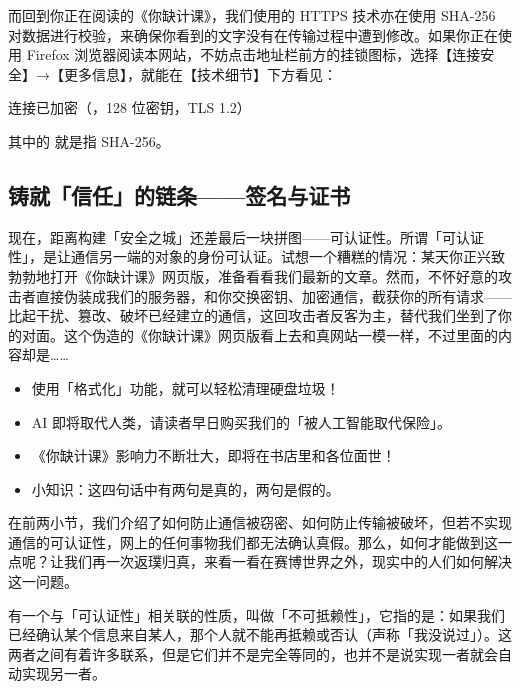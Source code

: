 而回到你正在阅读的《你缺计课》，我们使用的 HTTPS 技术亦在使用 SHA-256 对数据进行校验，来确保你看到的文字没有在传输过程中遭到修改。如果你正在使用 Firefox 浏览器阅读本网站，不妨点击地址栏前方的挂锁图标，选择【连接安全】→【更多信息】，就能在【技术细节】下方看见：

\begin{quoting}
  连接已加密（，128 位密钥，TLS 1.2）
\end{quoting}

其中的  就是指 SHA-256。

\subsection{铸就「信任」的链条——签名与证书}

现在，距离构建「安全之城」还差最后一块拼图——可认证性。所谓「可认证性」，是让通信另一端的对象的身份可认证。试想一个糟糕的情况：某天你正兴致勃勃地打开《你缺计课》网页版，准备看看我们最新的文章。然而，不怀好意的攻击者直接伪装成我们的服务器，和你交换密钥、加密通信，截获你的所有请求——比起干扰、篡改、破坏已经建立的通信，这回攻击者反客为主，替代我们坐到了你的对面。这个伪造的《你缺计课》网页版看上去和真网站一模一样，不过里面的内容却是……

\begin{quoting}
  \begin{itemize}
    \item 使用「格式化」功能，就可以轻松清理硬盘垃圾！
    \item AI 即将取代人类，请读者早日购买我们的「被人工智能取代保险」。
    \item 《你缺计课》影响力不断壮大，即将在书店里和各位面世！
    \item 小知识：这四句话中有两句是真的，两句是假的。
  \end{itemize}
\end{quoting}

在前两小节，我们介绍了如何防止通信被窃密、如何防止传输被破坏，但若不实现通信的可认证性，网上的任何事物我们都无法确认真假。那么，如何才能做到这一点呢？让我们再一次返璞归真，来看一看在赛博世界之外，现实中的人们如何解决这一问题。

\begin{note}
  有一个与「可认证性」相关联的性质，叫做「不可抵赖性」，它指的是：如果我们已经确认某个信息来自某人，那个人就不能再抵赖或否认（声称「我没说过」）。这两者之间有着许多联系，但是它们并不是完全等同的，也并不是说实现一者就会自动实现另一者。
\end{note}

